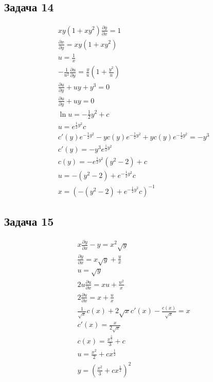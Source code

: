 \subsection*{Задача 14}
\begin{gather*}
	xy(1+xy^2) \frac{\partial y}{\partial x} = 1\\
	\frac{\partial x}{\partial y} = xy(1+xy^2)\\
	u = \frac{1}{x}\\
	-\frac{1}{u^2}\frac{\partial u}{\partial y} = \frac{y}{u}(1+\frac{y^2}{u})\\
	\frac{\partial u}{\partial y} + uy + y^3 = 0\\
	\frac{\partial u}{\partial y} + uy = 0\\
	\ln u = -\frac{1}{2}y^2 + c\\
	u = e^{\frac{1}{2}y^2} c\\
	c'(y) e^{-\frac{1}{2}y^2} - y c(y) e^{-\frac{1}{2}y^2} + yc(y) e^{-\frac{1}{2}y^2} = -y^3\\
	c'(y) = -y^3 e^{\frac{1}{2}y^2}\\
	c(y) = -e^{\frac{1}{2}y^2}(y^2 - 2) + c\\
	u = -(y^2 - 2) + e^{-\frac{1}{2}y^2}c\\
	x = \left(-(y^2 - 2) + e^{-\frac{1}{2}y^2}c\right)^{-1}
\end{gather*}

\subsection*{Задача 15}
\begin{gather*}
	x \frac{\partial y}{\partial x} - y = x^2 \sqrt{y}\\
	\frac{\partial y}{\partial x} = x\sqrt{y} + \frac{y}{x}\\
	u = \sqrt{y}\\
	2u \frac{\partial u}{\partial x} = x u + \frac{u^2}{x}\\
	2\frac{\partial u}{\partial x} = x + \frac{u}{x}\\
	\frac{1}{\sqrt{x}} c(x) + 2\sqrt{x}c'(x) - \frac{c(x)}{\sqrt{x}} = x\\
	c'(x) = \frac{x}{2\sqrt{x}}\\
	c(x) = \frac{x^{\frac{3}{2}}}{3} + c\\
	u = \frac{x^2}{2} + c x^{\frac{1}{2}}\\
	y = \left(\frac{x^2}{3} + c x^{\frac{1}{2}}\right)^2
\end{gather*}

